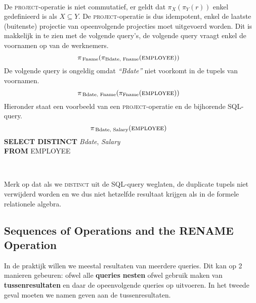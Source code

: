 ~

\noindent De \textsc{project}-operatie is niet commutatief, er geldt dat $\pi_X(\pi_Y(r))$ enkel gedefinieerd is als $X \subseteq Y$. De \textsc{project}-operatie is dus idempotent, enkel de laatste (buitenste) projectie van opeenvolgende projecties moet uitgevoerd worden. Dit is makkelijk in te zien met de volgende query's, de volgende query vraagt enkel de voornamen op van de werknemers.
\vspace{-2mm}
\[ \pi_{\,\text{Fname}}(\pi_\text{Bdate, Fname}(\textsc{employee})) \]
De volgende query is ongeldig omdat \textit{``Bdate''} niet voorkomt in de tupels van voornamen.
\vspace{-2mm}
\[ \pi_{\,\text{Bdate, Fname}}(\pi_\text{Fname}(\textsc{employee})) \]
Hieronder staat een voorbeeld van een \textsc{project}-operatie en de bijhorende SQL-query. 
\vspace{-2mm}
\[ \pi_{\,\text{Bdate, Salary}}(\textsc{employee}) \]
\indent \textbf{SELECT DISTINCT} \textit{Bdate}, \textit{Salary}\\
\indent	\textbf{FROM} EMPLOYEE

~

\noindent Merk op dat als we \textsc{distinct} uit de SQL-query weglaten, de duplicate tupels niet verwijderd worden en we dus niet hetzelfde resultaat krijgen als in de formele relationele algebra.


\subsection{Sequences of Operations and the RENAME Operation}
In de praktijk willen we meestal resultaten van meerdere queries. Dit kan op 2 manieren gebeuren: ofwel alle \textbf{queries nesten} ofwel gebruik maken van \textbf{tussenresultaten} en daar de opeenvolgende queries op uitvoeren. In het tweede geval moeten we namen geven aan de tussenresultaten.

